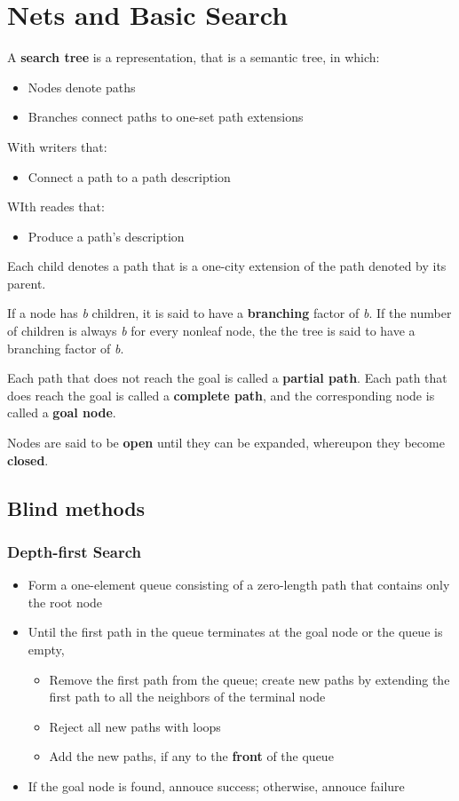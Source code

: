 \section{Nets and Basic Search}

A \textbf{search tree} is a representation, that is a semantic tree, in which:
\begin{itemize}
  \item Nodes denote paths
  \item Branches connect paths to one-set path extensions
\end{itemize}
With writers that:
\begin{itemize}
  \item Connect a path to a path description
\end{itemize}
WIth reades that:
\begin{itemize}
  \item Produce a path's description
\end{itemize}

Each child denotes a path that is a one-city extension of the path denoted by its parent.

If a node has \textit{b} children, it is said to have a \textbf{branching}
factor of \textit{b}. If the number of children is always \textit{b}
for every nonleaf node, the the tree is said to have a branching 
factor of \textit{b}.

Each path that does not reach the goal is called a \textbf{partial path}.
Each path that does reach the goal is called a \textbf{complete path},
and the corresponding node is called a \textbf{goal node}.

Nodes are said to be \textbf{open} until they can be expanded,
whereupon they become \textbf{closed}.

\subsection{Blind methods}

\subsubsection{Depth-first Search}

\begin{itemize}
  \item Form a one-element queue consisting of a zero-length path
    that contains only the root node
  \item Until the first path in the queue terminates at the goal node or the queue is empty,
    \begin{itemize}
      \item Remove the first path from the queue; create new paths
        by extending the first path to all the neighbors of the 
        terminal node
      \item Reject all new paths with loops
      \item Add the new paths, if any to the \textbf{front} of the queue
    \end{itemize}
  \item If the goal node is found, annouce success; otherwise, annouce 
    failure
\end{itemize}

